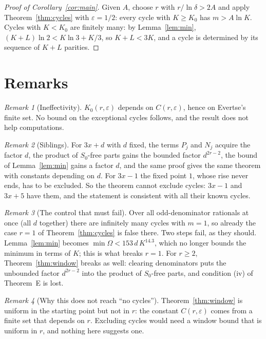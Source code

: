 \documentclass[11pt]{amsart}
\theoremstyle{remark}
\newtheorem{remark}{Remark}
\newcommand{\Om}{\Omega}
\begin{document}
\begin{proof}[Proof of Corollary~\ref{cor:main}]
Given $A$, choose $r$ with $r/\ln\delta>2A$ and apply Theorem~\ref{thm:cycles} with
$\varepsilon=1/2$: every cycle with $K\ge K_0$ has $m>A\ln K$. Cycles with $K<K_0$ are
finitely many: by Lemma~\ref{lem:min}, $(K+L)\ln2<K\ln3+K/3$, so $K+L<3K$, and a cycle is
determined by its sequence of $K+L$ parities.
\end{proof}

\section{Remarks}

\begin{remark}[Ineffectivity]
$K_0(r,\varepsilon)$ depends on $C(r,\varepsilon)$, hence on Evertse's finite set. No bound
on the exceptional cycles follows, and the result does not help computations.
\end{remark}

\begin{remark}[Siblings]
For $3x+d$ with $d$ fixed, the terms $P_j$ and $N_j$ acquire the factor $d$, the product of
$S_0$-free parts gains the bounded factor $d^{2r-2}$, the bound of Lemma~\ref{lem:min} gains
a factor $d$, and the same proof gives the same theorem with constants depending on $d$. For
$3x-1$ the fixed point $1$, whose rise never ends, has to be excluded. So the theorem cannot
exclude cycles: $3x-1$ and $3x+5$ have them, and the statement is consistent with all their
known cycles.
\end{remark}

\begin{remark}[The control that must fail]
Over all odd-denominator rationals at once (all $d$ together) there are infinitely many
cycles with $m=1$, so already the case $r=1$ of Theorem~\ref{thm:cycles} is false there. Two
steps fail, as they should. Lemma~\ref{lem:min} becomes $\min\Om<153\,d\,K^{14.3}$, which no
longer bounds the minimum in terms of $K$; this is what breaks $r=1$. For $r\ge 2$,
Theorem~\ref{thm:window} breaks as well: clearing denominators puts the unbounded factor
$d^{2r-2}$ into the product of $S_0$-free parts, and condition (iv) of Theorem~E is lost.
\end{remark}

\begin{remark}[Why this does not reach ``no cycles'']
Theorem~\ref{thm:window} is uniform in the starting point but not in $r$: the constant
$C(r,\varepsilon)$ comes from a finite set that depends on $r$. Excluding cycles would need a
window bound that is uniform in $r$, and nothing here suggests one.
\end{remark}
\end{document}
